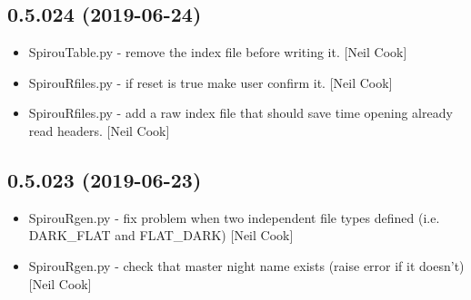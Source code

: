 \documentclass[a4paper,10pt,english]{report}
\begin{document}
\subsection{0.5.024 (2019-06-24)}
\label{\detokenize{misc/changelog:id111}}\begin{itemize}
\item {} 
SpirouTable.py - remove the index file before writing it. {[}Neil Cook{]}

\item {} 
SpirouRfiles.py - if reset is true make user confirm it. {[}Neil Cook{]}

\item {} 
SpirouRfiles.py - add a raw index file that should save time opening
already read headers. {[}Neil Cook{]}

\end{itemize}


\subsection{0.5.023 (2019-06-23)}
\label{\detokenize{misc/changelog:id112}}\begin{itemize}
\item {} 
SpirouRgen.py - fix problem when two independent file types defined
(i.e. DARK\_FLAT and FLAT\_DARK) {[}Neil Cook{]}

\item {} 
SpirouRgen.py - check that master night name exists (raise error if it
doesn’t) {[}Neil Cook{]}

\end{itemize}
\end{document}
